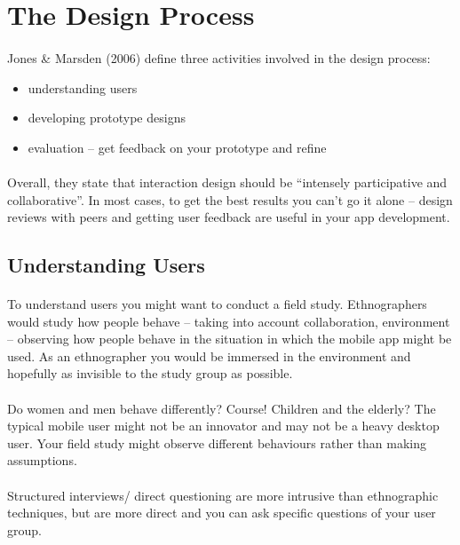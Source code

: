 \documentclass[12pt, a4paper, twoside]{book}
\begin{document}
\section{The Design Process}
\paragraph{} Jones \& Marsden (2006) define three activities involved in the design process:

\begin{itemize}
\item understanding users
\item developing prototype designs
\item evaluation – get feedback on your prototype and refine
\end{itemize}

\paragraph{} Overall, they state that interaction design should be “intensely participative and collaborative”. In most cases, to get the best results you can't go it alone – design reviews with peers and getting user feedback are useful in your app development.

\subsection{Understanding Users}
\paragraph{} To understand users you might want to conduct a field study. Ethnographers would study how people behave – taking into account collaboration, environment – observing how people behave in the situation in which the mobile app might be used. As an ethnographer you would be immersed in the environment and hopefully as invisible to the study group as possible.

\paragraph{} Do women and men behave differently? Course! Children and the elderly? The typical mobile user might not be an innovator and may not be a heavy desktop user. Your field study might observe different behaviours rather than making assumptions.

\paragraph{} Structured interviews/ direct questioning are more intrusive than ethnographic techniques, but are more direct and you can ask specific questions of your user group.
\end{document}

